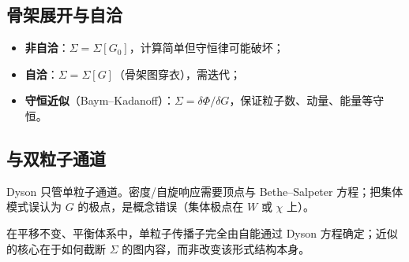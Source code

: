 \subsection{骨架展开与自洽}

\begin{itemize}
  \item \textbf{非自洽}：$\Sigma=\Sigma[G_0]$，计算简单但守恒律可能破坏；
  \item \textbf{自洽}：$\Sigma=\Sigma[G]$（骨架图穿衣），需迭代；
  \item \textbf{守恒近似}（Baym--Kadanoff）：$\Sigma=\delta\Phi/\delta G$，保证粒子数、动量、能量等守恒。
\end{itemize}

\subsection{与双粒子通道}

Dyson 只管单粒子通道。密度/自旋响应需要顶点与 Bethe--Salpeter 方程；把集体模式误认为 $G$ 的极点，是概念错误（集体极点在 $W$ 或 $\chi$ 上）。

\begin{theorem}[形式结构]
在平移不变、平衡体系中，单粒子传播子完全由自能通过 Dyson 方程确定；近似的核心在于如何截断 $\Sigma$ 的图内容，而非改变该形式结构本身。
\end{theorem}
